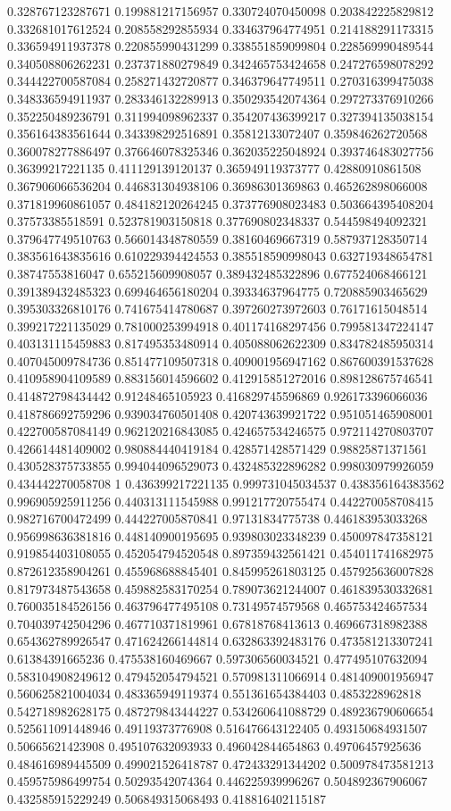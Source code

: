 \begin{table}
\begin{tabu}
\begin{sparkline}{10}
0.328767123287671 0.199881217156957 0.330724070450098 0.203842225829812 0.332681017612524 0.208558292855934 0.334637964774951 0.214188291173315 0.336594911937378 0.220855990431299 0.338551859099804 0.228569990489544 0.340508806262231 0.237371880279849 0.342465753424658 0.247276598078292 0.344422700587084 0.258271432720877 0.346379647749511 0.270316399475038 0.348336594911937 0.283346132289913 0.350293542074364 0.297273376910266 0.352250489236791 0.311994098962337 0.354207436399217 0.327394135038154 0.356164383561644 0.343398292516891 0.35812133072407 0.359846262720568 0.360078277886497 0.376646078325346 0.362035225048924 0.393746483027756 0.36399217221135 0.411129139120137 0.365949119373777 0.42880910861508 0.367906066536204 0.446831304938106 0.36986301369863 0.465262898066008 0.371819960861057 0.484182120264245 0.373776908023483 0.503664395408204 0.37573385518591 0.523781903150818 0.377690802348337 0.544598494092321 0.379647749510763 0.566014348780559 0.38160469667319 0.587937128350714 0.383561643835616 0.610229394424553 0.385518590998043 0.632719348654781 0.38747553816047 0.655215609908057 0.389432485322896 0.677524068466121 0.391389432485323 0.699464656180204 0.39334637964775 0.720885903465629 0.395303326810176 0.741675414780687 0.397260273972603 0.76171615048514 0.399217221135029 0.781000253994918 0.401174168297456 0.799581347224147 0.403131115459883 0.817495353480914 0.405088062622309 0.834782485950314 0.407045009784736 0.851477109507318 0.409001956947162 0.867600391537628 0.410958904109589 0.883156014596602 0.412915851272016 0.898128675746541 0.414872798434442 0.91248465105923 0.416829745596869 0.926173396066036 0.418786692759296 0.939034760501408 0.420743639921722 0.951051465908001 0.422700587084149 0.962120216843085 0.424657534246575 0.972114270803707 0.426614481409002 0.980884440419184 0.428571428571429 0.98825871371561 0.430528375733855 0.994044096529073 0.432485322896282 0.998030979926059 0.434442270058708 1 0.436399217221135 0.999731045034537 0.438356164383562 0.996905925911256 0.440313111545988 0.991217720755474 0.442270058708415 0.982716700472499 0.444227005870841 0.97131834775738 0.446183953033268 0.956998636381816 0.448140900195695 0.939803023348239 0.450097847358121 0.919854403108055 0.452054794520548 0.897359432561421 0.454011741682975 0.872612358904261 0.455968688845401 0.845995261803125 0.457925636007828 0.817973487543658 0.459882583170254 0.789073621244007 0.461839530332681 0.760035184526156 0.463796477495108 0.73149574579568 0.465753424657534 0.704039742504296 0.467710371819961 0.67818768413613 0.469667318982388 0.654362789926547 0.471624266144814 0.632863392483176 0.473581213307241 0.61384391665236 0.475538160469667 0.597306560034521 0.477495107632094 0.583104908249612 0.479452054794521 0.570981311066914 0.481409001956947 0.560625821004034 0.483365949119374 0.551361654384403 0.4853228962818 0.542718982628175 0.487279843444227 0.534260641088729 0.489236790606654 0.525611091448946 0.49119373776908 0.516476643122405 0.493150684931507 0.50665621423908 0.495107632093933 0.496042844654863 0.49706457925636 0.484616989445509 0.499021526418787 0.472433291344202 0.500978473581213 0.459575986499754 0.50293542074364 0.446225939996267 0.504892367906067 0.432585915229249 0.506849315068493 0.418816402115187 
\end{sparkline}
\end{tabu}
\end{table}
